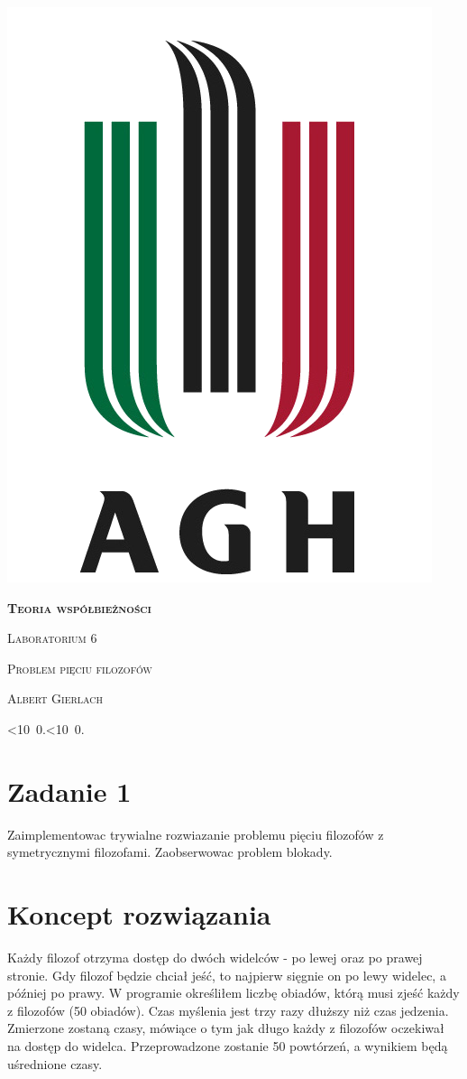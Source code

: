 \documentclass[12pt]{article}
\def\mydate{\leavevmode\hbox{\twodigits\day.\twodigits\month.\the\year}}
\def\twodigits#1{\ifnum#1<10 0\fi\the#1}
\begin{document}
\thispagestyle{empty}
\begin{center}
\begin{minipage}{0.75\linewidth}
    \centering
    \includegraphics[width=0.45\linewidth]{agh_logo2.png}
    \par
    \vspace{2cm}
    {\bfseries{\scshape{\Huge  Teoria współbieżności}}}
    \par
    \vspace{2cm}
    {\scshape{\Large Laboratorium 6}}
    \par
    \vspace{0.4cm}
    {\scshape{\Large Problem pięciu filozofów}}
    \par
    \vspace{3cm}

    {\scshape{\Large Albert Gierlach}}\par
    \vspace{1cm}

    {\Large \mydate}
\end{minipage}
\end{center}
\clearpage



\section{Zadanie 1}
Zaimplementowac trywialne rozwiazanie problemu pięciu filozofów z symetrycznymi filozofami. Zaobserwowac problem blokady.

  
\section{Koncept rozwiązania}
Każdy filozof otrzyma dostęp do dwóch widelców - po lewej oraz po prawej stronie. Gdy filozof będzie chciał jeść, to najpierw sięgnie on po lewy widelec, a później po prawy. W programie określiłem liczbę obiadów, którą musi zjeść każdy z filozofów (50 obiadów). Czas myślenia jest trzy razy dłuższy niż czas jedzenia. Zmierzone zostaną czasy, mówiące o tym jak długo każdy z filozofów oczekiwał na dostęp do widelca. Przeprowadzone zostanie 50 powtórzeń, a wynikiem będą uśrednione czasy.
\end{document}
